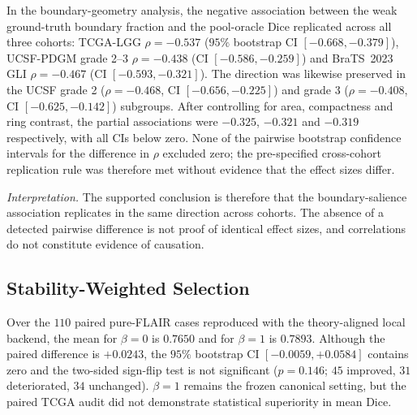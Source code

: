 \documentclass[11pt,a4paper]{article}
\begin{document}
In the boundary-geometry analysis, the negative association between the weak
ground-truth boundary fraction and the pool-oracle Dice replicated across all
three cohorts: TCGA-LGG $\rho=-0.537$ ($95\%$ bootstrap CI $[-0.668,-0.379]$),
UCSF-PDGM grade 2--3 $\rho=-0.438$ (CI $[-0.586,-0.259]$) and BraTS~2023 GLI
$\rho=-0.467$ (CI $[-0.593,-0.321]$). The direction was likewise preserved in the UCSF grade 2 ($\rho=-0.468$, CI $[-0.656,-0.225]$) and grade 3 ($\rho=-0.408$, CI $[-0.625,-0.142]$) subgroups. After controlling for area, compactness and ring contrast, the partial associations were $-0.325$, $-0.321$ and $-0.319$ respectively, with all CIs below zero. None of the pairwise bootstrap confidence intervals for the difference in $\rho$ excluded zero; the pre-specified cross-cohort replication rule was therefore met without evidence that the effect sizes differ.

\emph{Interpretation.} The supported conclusion is therefore that the
boundary-salience association replicates in the same direction across cohorts. The absence of a detected pairwise difference is not proof of identical effect sizes, and correlations do not constitute evidence of causation.

\subsection{Stability-Weighted Selection}\label{sec:stability}

Over the $110$ paired pure-FLAIR cases reproduced with the theory-aligned local backend, the mean for $\beta{=}0$ is $0.7650$ and for $\beta{=}1$ is $0.7893$. Although the paired difference is $+0.0243$, the $95\%$ bootstrap CI $[-0.0059,+0.0584]$ contains zero and the two-sided sign-flip test is not significant ($p{=}0.146$; $45$ improved, $31$ deteriorated, $34$ unchanged). $\beta{=}1$ remains the frozen canonical setting, but the paired TCGA audit did not demonstrate statistical superiority in mean Dice.
\end{document}

